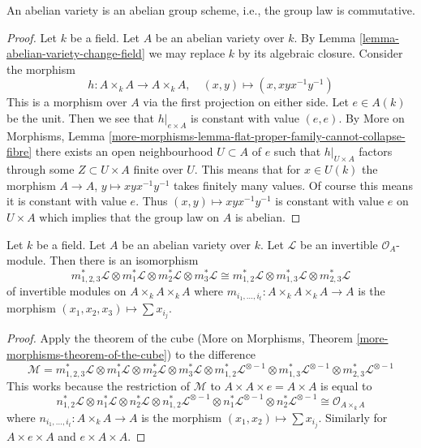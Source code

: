 \begin{lemma}
\label{lemma-abelian-variety-abelian}
An abelian variety is an abelian group scheme, i.e., the group
law is commutative.
\end{lemma}

\begin{proof}
Let $k$ be a field. Let $A$ be an abelian variety over $k$.
By Lemma \ref{lemma-abelian-variety-change-field} we may replace
$k$ by its algebraic closure. Consider the morphism
$$
h : A \times_k A \longrightarrow A \times_k A,\quad
(x, y) \longmapsto (x, xyx^{-1}y^{-1})
$$
This is a morphism over $A$ via the first projection on either side.
Let $e \in A(k)$ be the unit. Then we see that $h|_{e \times A}$ is
constant with value $(e, e)$. By More on Morphisms, Lemma
\ref{more-morphisms-lemma-flat-proper-family-cannot-collapse-fibre}
there exists an open neighbourhood $U \subset A$ of $e$
such that $h|_{U \times A}$ factors through some $Z \subset U \times A$
finite over $U$. This means that for $x \in U(k)$ the morphism
$A \to A$, $y \mapsto xyx^{-1}y^{-1}$ takes finitely many values.
Of course this means it is constant with value $e$. Thus
$(x, y) \mapsto xyx^{-1}y^{-1}$ is
constant with value $e$ on $U \times A$ which implies
that the group law on $A$ is abelian.
\end{proof}

\begin{lemma}
\label{lemma-apply-cube}
Let $k$ be a field. Let $A$ be an abelian variety over $k$.
Let $\mathcal{L}$ be an invertible $\mathcal{O}_A$-module.
Then there is an isomorphism
$$
m_{1, 2, 3}^*\mathcal{L} \otimes
m_1^*\mathcal{L} \otimes
m_2^*\mathcal{L} \otimes
m_3^*\mathcal{L} \cong
m_{1, 2}^*\mathcal{L} \otimes
m_{1, 3}^*\mathcal{L} \otimes
m_{2, 3}^*\mathcal{L}
$$
of invertible modules on $A \times_k A \times_k A$
where $m_{i_1, \ldots, i_t} : A \times_k A \times_k A \to A$
is the morphism $(x_1, x_2, x_3) \mapsto \sum x_{i_j}$.
\end{lemma}

\begin{proof}
Apply the theorem of the cube
(More on Morphisms, Theorem \ref{more-morphisms-theorem-of-the-cube})
to the difference
$$
\mathcal{M} =
m_{1, 2, 3}^*\mathcal{L} \otimes
m_1^*\mathcal{L} \otimes
m_2^*\mathcal{L} \otimes
m_3^*\mathcal{L} \otimes
m_{1, 2}^*\mathcal{L}^{\otimes -1} \otimes
m_{1, 3}^*\mathcal{L}^{\otimes -1} \otimes
m_{2, 3}^*\mathcal{L}^{\otimes -1}
$$
This works because the restriction of $\mathcal{M}$
to $A \times A \times e = A \times A$ is equal to
$$
n_{1, 2}^*\mathcal{L} \otimes
n_1^*\mathcal{L} \otimes
n_2^*\mathcal{L} \otimes
n_{1, 2}^*\mathcal{L}^{\otimes -1} \otimes
n_1^*\mathcal{L}^{\otimes -1} \otimes
n_2^*\mathcal{L}^{\otimes -1} \cong \mathcal{O}_{A \times_k A}
$$
where $n_{i_1, \ldots, i_t} : A \times_k A \to A$
is the morphism $(x_1, x_2) \mapsto \sum x_{i_j}$.
Similarly for $A \times e \times A$ and $e \times A \times A$.
\end{proof}

